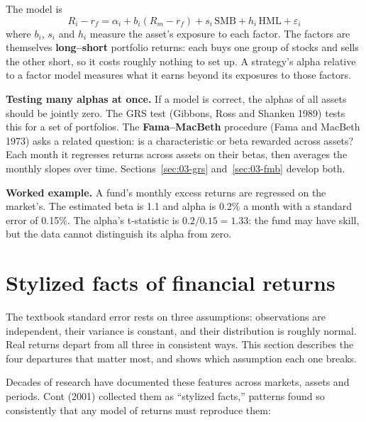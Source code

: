The model is
\begin{equation}
  R_i - r_f = \alpha_i + b_i(R_m - r_f) + s_i\,\mathrm{SMB} + h_i\,\mathrm{HML} + \varepsilon_i
  \label{eq:03-ff3}
\end{equation}
where $b_i$, $s_i$ and $h_i$ measure the asset's exposure to each factor. The factors are themselves \textbf{long--short} portfolio returns: each buys one group of stocks and sells the other short, so it costs roughly nothing to set up. A strategy's alpha relative to a factor model measures what it earns beyond its exposures to those factors.

\textbf{Testing many alphas at once.} If a model is correct, the alphas of all assets should be jointly zero. The GRS test (Gibbons, Ross and Shanken 1989) tests this for a set of portfolios. The \textbf{Fama--MacBeth} procedure (Fama and MacBeth 1973) asks a related question: is a characteristic or beta rewarded across assets? Each month it regresses returns across assets on their betas, then averages the monthly slopes over time. Sections~\ref{sec:03-grs} and~\ref{sec:03-fmb} develop both.

\textbf{Worked example.} A fund's monthly excess returns are regressed on the market's. The estimated beta is 1.1 and alpha is 0.2\% a month with a standard error of 0.15\%. The alpha's t-statistic is $0.2/0.15 = 1.33$: the fund may have skill, but the data cannot distinguish its alpha from zero.


\section{Stylized facts of financial returns}
\label{sec:03-facts}

The textbook standard error rests on three assumptions: observations are
independent, their variance is constant, and their distribution is roughly
normal. Real returns depart from all three in consistent ways. This section
describes the four departures that matter most, and shows which assumption each
one breaks.

Decades of research have documented these features across markets, assets and
periods. Cont (2001) collected them as ``stylized facts,'' patterns found so
consistently that any model of returns must reproduce them:

